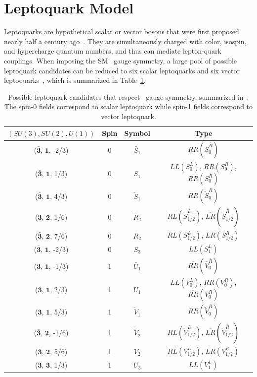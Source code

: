 \section{Leptoquark Model}
\label{sec:Leptoquark}

Leptoquarks are hypothetical scalar or vector bosons that were first proposed nearly half a century ago~\cite{Pati:1973uk}. They are simultaneously charged with color, isospin, and hypercharge quantum numbers, and thus can mediate lepton-quark couplings. When imposing the \ac{SM} \sm~gauge symmetry, a large pool of possible leptoquark candidates can be reduced to six scalar leptoquarks and six vector leptoquarks~\cite{Dorsner:2016wpm}, which is summarized in Table~\ref{tab:Leptoquark}. 

\begin{table}[th]
\sffamily
\centering
\caption{Possible leptoquark candidates that respect \sm~gauge symmetry, summarized in~\cite{Dorsner:2016wpm}. The spin-0 fields correspond to scalar leptoquark while spin-1 fields correspond to vector leptoquark.}
\begin{tabular}{cccc}
\toprule 
$(SU(3), SU(2), U(1))$ & Spin   & Symbol & Type \\ \midrule
($\bar{\bm{3}}$, $\bm{1}$, -2/3) & 0 & $\bar{S}_{1}$ & $\overline{RR}(\bar{S}_{0}^{\bar{R}})$ \\
($\bar{\bm{3}}$, $\bm{1}$, 1/3) & 0 & $S_{1}$ & $LL(S_{0}^{L})$, $RR(S_{0}^{R})$, $\overline{RR}(S_{0}^{\bar{R}})$ \\
($\bar{\bm{3}}$, $\bm{1}$, 4/3) & 0 & $\tilde{S}_{1}$ & $RR(\tilde{S}_{0}^{R})$ \\
($\bm{\bm{3}}$, $\bm{2}$, 1/6) & 0 & $\tilde{R}_{2}$ & $RL(\tilde{S}_{1/2}^{L})$, $\overline{LR}(\tilde{S}_{1/2}^{\bar{R}})$ \\
($\bar{\bm{3}}$, $\bm{2}$, 7/6) & 0 & $R_{2}$ & $RL(S_{1/2}^{L})$, $LR(S_{1/2}^{R})$ \\
($\bar{\bm{3}}$, $\bm{1}$, -2/3) & 0 & $S_{3}$ & $LL(S_{1}^{L})$\\
\midrule
($\bm{3}$, $\bm{1}$, -1/3) & 1 & $\bar{U}_{1}$ & $\overline{RR}(\bar{V}_{0}^{\bar{R}})$ \\
($\bm{3}$, $\bm{1}$, 2/3) & 1 & $U_{1}$ & $LL(V_{0}^{L})$, $RR(V_{0}^{R})$, $\overline{RR}(V_{0}^{\bar{R}})$ \\
($\bm{3}$, $\bm{1}$, 5/3) & 1 & $\tilde{V}_{1}$ & $RR(\tilde{V}_{0}^{R})$ \\
($\bar{\bm{3}}$, $\bm{2}$, -1/6) & 1 & $\tilde{V}_{2}$ & $RL(\tilde{V}_{1/2}^{L})$, $\overline{LR}(\tilde{V}_{1/2}^{\bar{R}})$ \\
($\bar{\bm{3}}$, $\bm{2}$, 5/6) & 1 & $V_{2}$ & $RL(V_{1/2}^{L})$, $LR(V_{1/2}^{R})$ \\
($\bm{3}$, $\bm{3}$, 1/3) & 1 & $U_{3}$ & $LL(V_{1}^{L})$\\
\bottomrule
\end{tabular}
\vspace{-0.5em}
\label{tab:Leptoquark}
\end{table}

